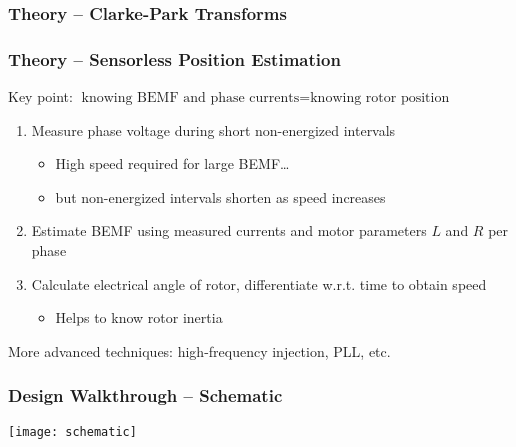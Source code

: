 \begin{frame}\frametitle{Theory -- Clarke-Park Transforms}
	\begin{center}
		
	\end{center}
\end{frame}
\begin{frame}\frametitle{Theory -- Sensorless Position Estimation}
	Key point: $\text{knowing BEMF and phase currents}=\text{knowing rotor position}$
	\begin{enumerate}
		\item Measure phase voltage during short non-energized intervals
		\begin{itemize}
			\item High speed required for large BEMF\ldots
			\item but non-energized intervals shorten as speed increases
		\end{itemize}
		\item Estimate BEMF using measured currents and motor parameters $L$ and $R$ per phase
		\item Calculate electrical angle of rotor, differentiate w.r.t. time to obtain speed
		\begin{itemize}
			\item Helps to know rotor inertia
		\end{itemize}
	\end{enumerate}
	More advanced techniques: high-frequency injection, PLL, etc.
\end{frame}
\begin{frame}\frametitle{Design Walkthrough -- Schematic}
	\texttt{[image: schematic]}
\end{frame}
